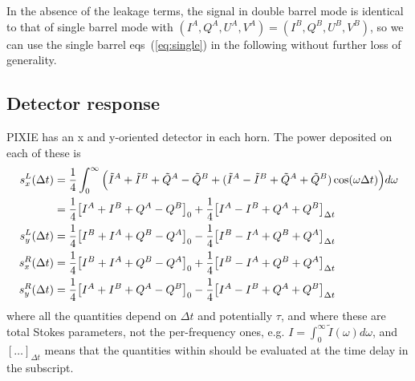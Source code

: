 \documentclass{article}
\newcommand{\I}{\tilde I}
\newcommand{\Q}{\tilde Q}
\begin{document}
In the absence of the leakage terms, the signal in double barrel mode is
identical to that of single barrel mode with $(I^A,Q^A,U^A,V^A)=(I^B,Q^B,U^B,V^B)$,
so we can use the single barrel eqs~(\ref{eq:single}) in the following
without further loss of generality.

\subsection{Detector response}
PIXIE has an x and y-oriented detector in each horn. The power deposited on each
of these is
\begin{align}
	s^L_x(\Delta t)
		&= \frac14 \int_0^\infty\Big(\I^A+\I^B+\Q^A-\Q^B + (\I^A-\I^B+\Q^A+\Q^B)\cos(\omega\Delta t)\Big)d\omega \notag \\
		&= \frac14 \big[I^A+I^B+Q^A-Q^B\big]_0 + \frac14\big[I^A-I^B+Q^A+Q^B\big]_{\Delta t} \notag \\
	s^L_y(\Delta t)
		&= \frac14 \big[I^B+I^A+Q^B-Q^A\big]_0 - \frac14\big[I^B-I^A+Q^B+Q^A\big]_{\Delta t} \notag \\
	s^R_x(\Delta t)
		&= \frac14 \big[I^B+I^A+Q^B-Q^A\big]_0 + \frac14\big[I^B-I^A+Q^B+Q^A\big]_{\Delta t} \notag \\
	s^R_y(\Delta t)
		&= \frac14 \big[I^A+I^B+Q^A-Q^B\big]_0 - \frac14\big[I^A-I^B+Q^A+Q^B\big]_{\Delta t}
\end{align}
where all the quantities depend on $\Delta t$ and potentially $\tau$,
and where these are total Stokes parameters, not the per-frequency ones,
e.g. $I = \int_0^\infty \I(\omega) d\omega$, and $[\ldots]_{\Delta t}$
means that the quantities within should be evaluated at the time delay in
the subscript.
\end{document}
